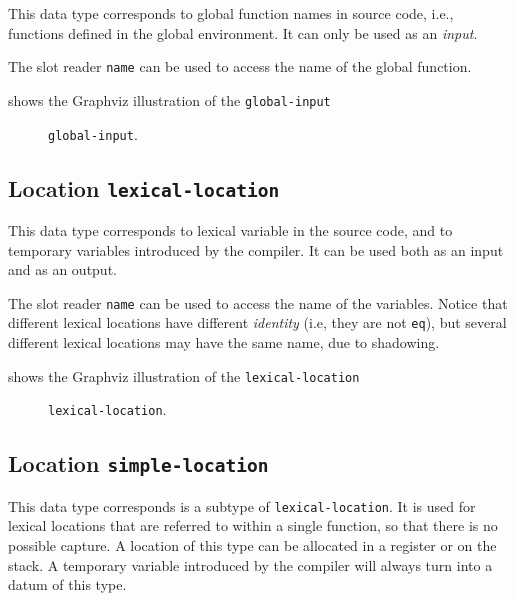 This data type corresponds to global function names in source code,
i.e., functions defined in the global environment.  It can only be
used as an \emph{input}.

The slot reader \texttt{name} can be used to access the name of the
global function.

 shows the Graphviz illustration of the
\texttt{global-input}

\begin{figure}
\begin{center}
\end{center}
\caption{\label{fig-global-input}
\texttt{global-input}.}
\end{figure}

\subsection{Location \texttt{lexical-location}}

This data type corresponds to lexical variable in the source code, and
to temporary variables introduced by the compiler.  It can be used
both as an input and as an output.

The slot reader \texttt{name} can be used to access the name of the
variables.  Notice that different lexical locations have different
\emph{identity} (i.e, they are not \texttt{eq}), but several different
lexical locations may have the same name, due to shadowing.

 shows the Graphviz illustration of the
\texttt{lexical-location}

\begin{figure}
\begin{center}
\end{center}
\caption{\label{fig-lexical-location}
\texttt{lexical-location}.}
\end{figure}

\subsection{Location \texttt{simple-location}}

This data type corresponds is a subtype of \texttt{lexical-location}.
It is used for lexical locations that are referred to within a single
function, so that there is no possible capture.  A location of this
type can be allocated in a register or on the stack.  A temporary
variable introduced by the compiler will always turn into a datum of
this type.

